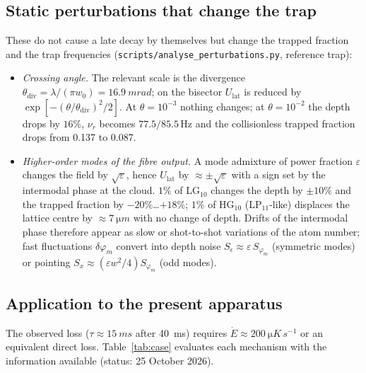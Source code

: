 \documentclass[11pt,a4paper]{article}
\newcommand{\Ulat}{U_\mathrm{lat}}
\begin{document}
\subsection{Static perturbations that change the trap}
\label{sec:noise_static}
These do not cause a late decay by themselves but change the trapped fraction and the trap frequencies (\texttt{scripts/analyse\_perturbations.py}, reference trap):
\begin{itemize}[leftmargin=*]
\item \emph{Crossing angle.} The relevant scale is the divergence $\theta_\mathrm{div}=\lambda/(\pi w_0)=\SI{16.9}{mrad}$; on the bisector $\Ulat$ is reduced by $\exp[-(\theta/\theta_\mathrm{div})^2/2]$. At $\theta=10^{-3}$ nothing changes; at $\theta=10^{-2}$ the depth drops by $16\%$, $\nu_r$ becomes $77.5/85.5$\,Hz and the collisionless trapped fraction drops from 0.137 to 0.087.
\item \emph{Higher-order modes of the fibre output.} A mode admixture of power fraction $\varepsilon$ changes the field by $\sqrt\varepsilon$, hence $\Ulat$ by $\approx\pm\sqrt\varepsilon$ with a sign set by the intermodal phase at the cloud. $1\%$ of LG$_{10}$ changes the depth by $\pm10\%$ and the trapped fraction by $-20\%$\ldots$+18\%$; $1\%$ of HG$_{10}$ (LP$_{11}$-like) displaces the lattice centre by $\approx\SI{7}{\micro m}$ with no change of depth. Drifts of the intermodal phase therefore appear as slow or shot-to-shot variations of the atom number; fast fluctuations $\delta\varphi_m$ convert into depth noise $S_\epsilon\approx\varepsilon\,S_{\varphi_m}$ (symmetric modes) or pointing $S_x\approx(\varepsilon w^2/4)S_{\varphi_m}$ (odd modes).
\end{itemize}

\subsection{Application to the present apparatus}
\label{sec:noise_case}
The observed loss ($\tau\approx\SI{15}{ms}$ after \SI{40}{ms}) requires $\dot E\approx\SI{200}{\micro K\,s^{-1}}$ or an equivalent direct loss. Table~\ref{tab:case} evaluates each mechanism with the information available (status: 25 October 2026).
\end{document}
